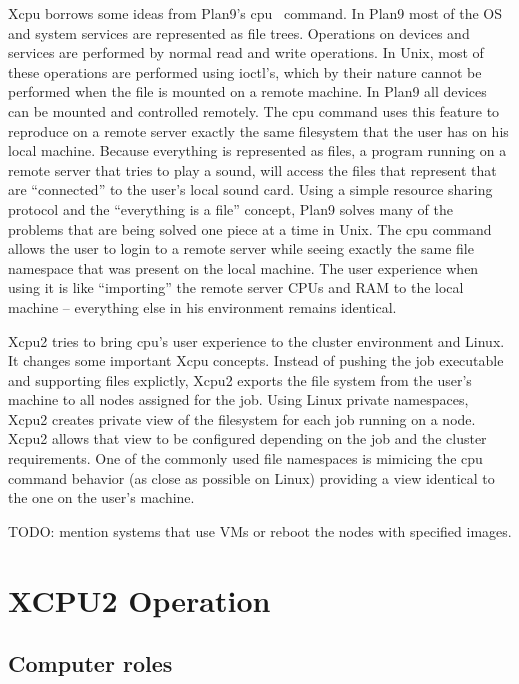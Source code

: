\documentclass[10pt,conference,letterpaper]{IEEEtran}
\begin{document}
Xcpu borrows some ideas from Plan9's cpu~\cite{plan9-cpu} command. In Plan9
most of the OS and system services are represented as file trees. Operations
on devices and services are performed by normal read and write operations.
In Unix, most of these operations are performed using ioctl's, which by
their nature cannot be performed when the file is mounted on a remote
machine. In Plan9 all devices can be mounted and controlled remotely. The
cpu command uses this feature to reproduce on a remote server exactly the
same filesystem that the user has on his local machine. Because everything
is represented as files, a program running on a remote server that tries to
play a sound, will access the files that represent that are ``connected'' to
the user's local sound card. Using a simple resource sharing protocol and
the ``everything is a file'' concept, Plan9 solves many of the problems that
are being solved one piece at a time in Unix. The cpu command allows the
user to login to a remote server while seeing exactly the same file
namespace that was present on the local machine. The user experience when
using it is like ``importing'' the remote server CPUs and RAM to the local
machine -- everything else in his environment remains identical.

Xcpu2 tries to bring cpu's user experience to the cluster environment and
Linux. It changes some important Xcpu concepts. Instead of pushing the job
executable and supporting files explictly, Xcpu2 exports the file system
from the user's machine to all nodes assigned for the job. Using Linux
private namespaces, Xcpu2 creates private view of the filesystem for each
job running on a node. Xcpu2 allows that view to be configured depending on
the job and the cluster requirements. One of the commonly used file
namespaces is mimicing the cpu command behavior (as close as possible on
Linux) providing a view identical to the one on the user's machine.

TODO: mention systems that use VMs or reboot the nodes with specified images.

\section{XCPU2 Operation}

\subsection{Computer roles}
\end{document}
